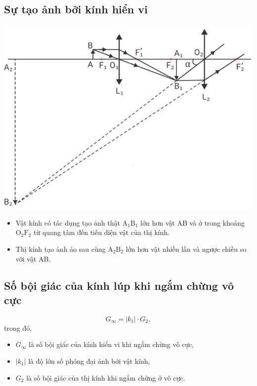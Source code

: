 \subsection{Sự tạo ảnh bởi kính hiển vi}
\begin{center}
	\includegraphics[scale=0.7]{../figs/VN11-PH-42-L-030-1-h51.jpg}
\end{center}
\begin{itemize}
	\item Vật kính có tác dụng tạo ảnh thật $\text{A}_1\text{B}_1$ lớn hơn vật AB và ở trong khoảng
	$\text{O}_2\text{F}_2$ từ quang tâm đến tiêu diện vật của thị kính.
	\item Thị kính tạo ảnh ảo sau cùng $\text{A}_2\text{B}_2$ lớn hơn vật nhiều lần và ngược chiều
	so với vật AB.
\end{itemize}


\subsection{Số bội giác của kính lúp khi ngắm chừng vô cực}
\begin{equation}
G_\infty=|k_1|\cdot G_2,
\end{equation}
trong đó,
\begin{itemize}
	\item $G_\infty$ là số bội giác của kính hiển vi khi ngắm chừng vô cực,
	\item $|k_1|$ là độ lớn số phóng đại ảnh bởi vật kính,
	\item $G_2$ là số bội giác của thị kính khi ngắm chừng ở vô cực. 
\end{itemize}

